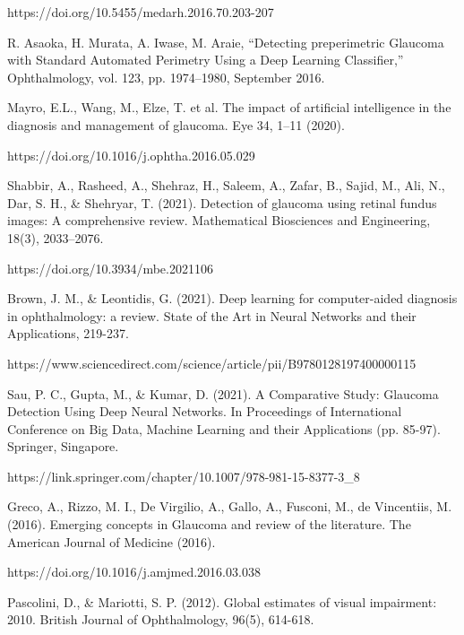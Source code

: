 \noindent https://doi.org/10.5455/medarh.2016.70.203-207

\vspace{5mm}
\noindent[14]  R. Asaoka, H. Murata, A. Iwase, M. Araie, “Detecting preperimetric Glaucoma with Standard Automated Perimetry Using a Deep Learning Classifier,” Ophthalmology, vol. 123, pp. 1974–1980, September 2016.

\vspace{5mm}
\noindent[15]  Mayro, E.L., Wang, M., Elze, T. et al. The impact of artificial intelligence in the diagnosis and management of glaucoma. Eye 34, 1–11 (2020). 

\noindent https://doi.org/10.1016/j.ophtha.2016.05.029

\vspace{5mm}
\noindent[16]  Shabbir, A., Rasheed, A., Shehraz, H., Saleem, A., Zafar, B., Sajid, M., Ali, N., Dar, S. H., & Shehryar, T. (2021). Detection of glaucoma using retinal fundus images: A comprehensive review. Mathematical Biosciences and Engineering, 18(3), 2033–2076. 

\noindent https://doi.org/10.3934/mbe.2021106

\vspace{5mm}
\noindent[17] Brown, J. M., & Leontidis, G. (2021). Deep learning for computer-aided diagnosis in ophthalmology: a review. State of the Art in Neural Networks and their Applications, 219-237.


\noindent https://www.sciencedirect.com/science/article/pii/B9780128197400000115

\vspace{5mm}
\noindent[18] Sau, P. C., Gupta, M., & Kumar, D. (2021). A Comparative Study: Glaucoma Detection Using Deep Neural Networks. In Proceedings of International Conference on Big Data, Machine Learning and their Applications (pp. 85-97). Springer, Singapore.

\noindent https://link.springer.com/chapter/10.1007/978-981-15-8377-3_8

\vspace{5mm}
\noindent[19] Greco, A., Rizzo, M. I., De Virgilio, A., Gallo, A., Fusconi, M., de Vincentiis, M. (2016). Emerging concepts in Glaucoma and review of the literature. The American Journal of Medicine (2016).

\noindent https://doi.org/10.1016/j.amjmed.2016.03.038

\vspace{5mm}
\noindent[20] Pascolini, D., & Mariotti, S. P. (2012). Global estimates of visual impairment: 2010. British Journal of Ophthalmology, 96(5), 614-618.

